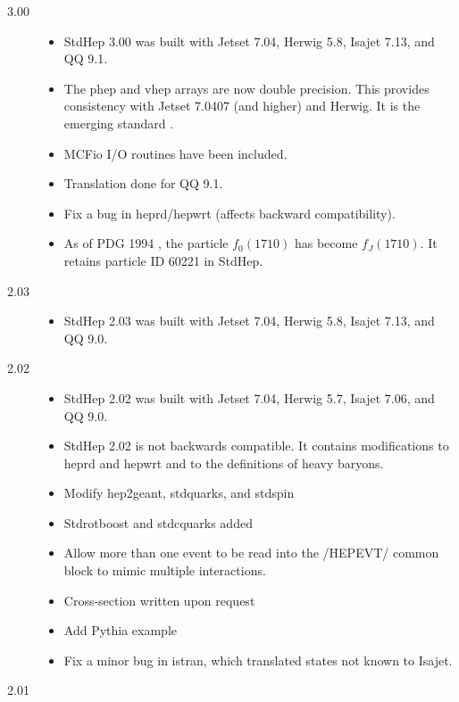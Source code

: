 \begin{description}
\item[3.00]

\begin{itemize}
\item StdHep 3.00 was built with Jetset 7.04, Herwig 5.8, Isajet 7.13, and QQ 9.1.
\item The phep and vhep arrays are now double precision.
This provides consistency with Jetset 7.0407 (and higher) and Herwig.  
It is the emerging standard \cite{lund}.
\item MCFio I/O routines have been included.
\item Translation done for QQ 9.1.
\item Fix a bug in heprd/hepwrt (affects backward compatibility).
\item As of PDG 1994 \cite{pdg94}, the particle $f_0(1710)$ 
has become $f_J(1710)$.  It retains particle ID 60221 in StdHep.
\end{itemize}

\item[2.03]

\begin{itemize}
\item StdHep 2.03 was built with Jetset 7.04, Herwig 5.8, Isajet 7.13, and QQ 9.0.
\end{itemize}

\item[2.02]

\begin{itemize}
\item StdHep 2.02 was built with Jetset 7.04, Herwig 5.7, Isajet 7.06, and QQ 9.0.
\item StdHep 2.02 is not backwards compatible.  It contains modifications
to heprd and hepwrt and to the definitions of heavy baryons.
\item Modify hep2geant, stdquarks, and stdspin
\item Stdrotboost and stdcquarks added
\item Allow more than one event to be read into the /HEPEVT/ common block
to mimic multiple interactions.
\item Cross-section written upon request
\item Add Pythia example
\item Fix a minor bug in istran, which translated states not known to Isajet.
\end{itemize}

\item[2.01]


\end{description}
